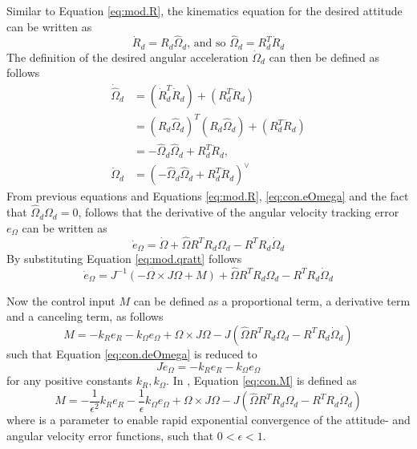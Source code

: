Similar to Equation \ref{eq:mod.R}, the kinematics equation for the desired attitude can be written as
\begin{equation}\label{eq:con.dotRd}
\dot{R}_d=R_d\hat{\Omega}_d \text{, and so } \hat{\Omega}_d=R_d^T\dot{R}_d
\end{equation}
The definition of the desired angular acceleration $ \dot{\Omega}_d $ can then be defined as follows
\begin{equation}\label{key}
\begin{aligned}
\dot{\hat{\Omega}}_d&=(\dot{R}_d^T\dot{R}_d)+(R_d^T\ddot{R}_d)\\
&=(R_d\hat{\Omega}_d)^T(R_d\hat{\Omega}_d)+(R_d^T\ddot{R}_d)\\
&=-\hat{\Omega}_d\hat{\Omega}_d+R_d^T\ddot{R}_d,\\
\dot{\Omega}_d&=(-\hat{\Omega}_d\hat{\Omega}_d+R_d^T\ddot{R}_d)^\vee
\end{aligned}
\end{equation}
From previous equations and Equations \ref{eq:mod.R}, \ref{eq:con.eOmega} and the fact that $ \hat{\Omega}_d\Omega_d =0$, follows that the derivative of the angular velocity tracking error $ e_\Omega $ can be written as 
\begin{equation}\label{eq:con.deOmega}
\dot{e}_\Omega=\dot{\Omega}+\hat{\Omega}R^TR_d\Omega_d-R^TR_d\dot{\Omega}_d
\end{equation}
By substituting Equation \ref{eq:mod.qratt} follows
\begin{equation}\label{eq:con.dOmega}
\dot{e}_\Omega=J^{-1}(-\Omega\times J\Omega + M)+\hat{\Omega}R^TR_d\Omega_d-R^TR_d\dot{\Omega}_d
\end{equation}

Now the control input $ M $ can be defined as a proportional term, a derivative term and a canceling term, as follows \cite{Sreenath2013c}
\begin{equation}\label{eq:con.M}
M = -k_Re_R-k_\Omega e_\Omega+\Omega\times J\Omega-J(\hat{\Omega}R^TR_d\Omega_d-R^TR_d\dot{\Omega}_d)
\end{equation}
such that Equation \ref{eq:con.deOmega} is reduced to
\begin{equation}\label{eq:con.JdeOmega}
J\dot{e}_\Omega=-k_Re_R-k_\Omega e_\Omega
\end{equation}
for any positive constants $ k_R, k_\Omega $.
In \cite{Sreenath2013b}, Equation \ref{eq:con.M} is defined as
\begin{equation}\label{eq:con.Meps}
M = -\frac{1}{\epsilon^2}k_Re_R-\frac{1}{\epsilon}k_\Omega e_\Omega+\Omega\times J\Omega-J(\hat{\Omega}R^TR_d\Omega_d-R^TR_d\dot{\Omega}_d)
\end{equation}
where  is a parameter to enable rapid exponential convergence of the attitude- and angular velocity error functions, such that $ 0<\epsilon<1 $.\\
 
